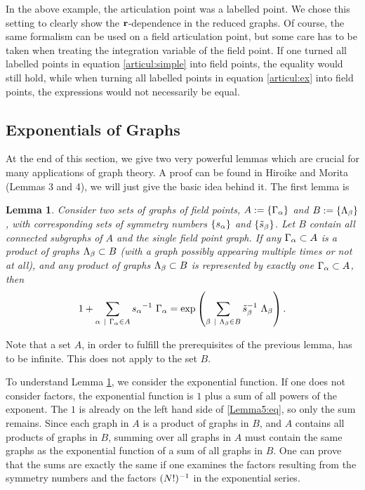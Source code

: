 \documentclass[8.5pt,twoside,twocolumn]{article}
\renewcommand\r{\bo r}
\theoremstyle{standard}
\newtheorem{lem}[theo]{Lemma}
\begin{document}
In the above example, the articulation point was a labelled point. We chose this
setting to clearly show the $\r$-dependence in the reduced graphs. Of course, the same
formalism can be used on a field articulation point, but some care has to be taken
when treating the integration variable of the field point. If one turned all labelled
points in equation \eqref{articul:simple} into field points, the equality would still hold,
while when turning all labelled points in equation \eqref{articul:ex} into field points,
the expressions would not necessarily be equal.

\subsection{Exponentials of Graphs}
At the end of this section, we give two very powerful lemmas which are crucial for many
applications of graph theory. A proof can be found in Hiroike and Morita \cite{Hiroike} (Lemmas 3 and 4),
we will just give the basic idea behind it. The first lemma is

\begin{lem}
\label{lemma:exponential}
Consider two sets of graphs of field points, $A:=\left\{{\Gamma_{\alpha}} \right\}$ and $B:=\left\{{\Lambda_{\beta}} \right\}$,
with corresponding sets of symmetry numbers $\left\{{s_{\alpha}} \right\}$ and $\left\{{\tilde s_{\beta}} \right\}$.
Let $B$ contain all connected subgraphs of $A$ and the single field point graph. If any $\Gamma_{\alpha} \subset A$ is
a product of graphs $\Lambda_{\beta} \subset B$ (with a graph possibly appearing multiple times or not at all), and any
product of graphs $\Lambda_{\beta} \subset B$ is represented by exactly one $\Gamma_{\alpha} \subset A$, then
\begin{equation}
1 + \sum_{\al\ |\ \Ga_\al \in A} {s_\al}\iv\ \Ga_\al = \exp\lt(\sum_{\be\ |\ \La_\be \in B} {\tilde s_\be}\iv\ \La_\be \rt).
\label{Lemma5:eq}
\end{equation}
\end{lem}
Note that a set $A$, in order to fulfill the prerequisites of the previous lemma, has to be
infinite. This does not apply to the set $B$.

To understand Lemma \ref{lemma:exponential}, we consider the exponential function. If one does not
consider factors, the exponential function is $1$ plus a sum of all powers of the exponent.
The $1$ is already on the left hand side of \eqref{Lemma5:eq}, so only the sum remains. Since each graph in $A$ is a product of graphs in
$B$, and $A$ contains all products of graphs in $B$, summing over all graphs in $A$ must contain
the same graphs as the exponential function of a sum of all graphs in $B$. One can prove
that the sums are exactly the same if one examines the factors resulting from the symmetry
numbers and the factors $(N!)^{-1}$ in the exponential series.
\end{document}
